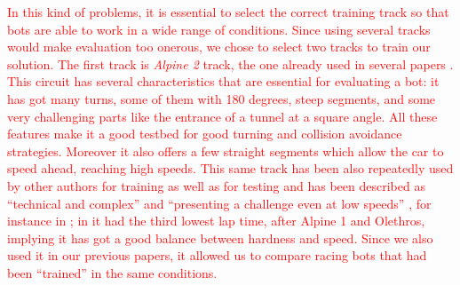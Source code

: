 \documentclass[10pt,journal,compsoc]{IEEEtran}
\begin{document}
\textcolor{red}{
In this kind of problems, it is essential to select the correct
training track so that bots are able to work in a wide range of
conditions. Since using several tracks would make evaluation too onerous, we chose to select two tracks to train our solution.} \textcolor{red}{The first track is \textit{Alpine 2} track, the one already used in several papers  \cite{salem_cig2018,DBLP:conf/cig/SalemMG19}. This circuit has several characteristics that
are essential for evaluating a bot: it has got many turns, some of
them with 180 degrees, steep segments, and some very challenging parts
like the entrance of a tunnel at a square angle. All these features make
it a good testbed for good turning and collision avoidance
strategies. Moreover it also offers a few straight segments which allow the car to speed ahead, reaching high speeds. This same track has been also repeatedly used by other authors for training as well as for testing and has been described as ``technical and complex'' \cite{AG} and ``presenting a challenge even at low speeds'' \cite{vrajitoru2018global}, for instance in
\cite{cardamone2010applying,CarRacing_Pelta09,zong2017obstacle}; in \cite{AG} it had the third lowest lap time, after Alpine 1 and Olethros, implying it
has got a good balance between hardness and speed. Since we also used
it in our previous papers, it allowed us to compare racing bots that
had been ``trained'' in the same conditions.}
\end{document}
